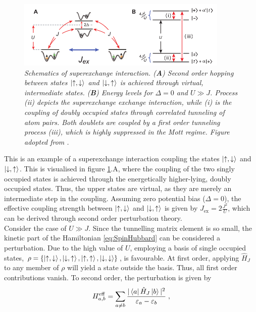 \begin{figure}[h]
	\centering
	\includegraphics[width=0.9\textwidth]{Figures/SXEschematic.pdf}
	\caption{\textit{Schematics of superexchange interaction. (\textbf{A}) Second order hopping between states $\ket{\uparrow,\downarrow}$ and $\ket{\downarrow,\uparrow}$ is achieved through virtual, intermediate states. (\textbf{B}) Energy levels for $\Delta = 0$ and $U \gg J$. Process (ii) depicts the superexchange exchange interaction, while (i) is the coupling of doubly occupied states through correlated tunneling of atom pairs. Both doublets are coupled by a first order tunneling process (iii), which is highly suppressed in the Mott regime. Figure adopted from \cite{Trotzky2008}.}}
	\label{fig:superexchange}
\end{figure}
This is an example of a superexchange interaction coupling the states $\ket{\uparrow,\downarrow}$ and $\ket{\downarrow,\uparrow}$. This is visualised in figure \ref{fig:superexchange}.A, where the coupling of the two singly occupied states is achieved through the energetically higher-lying, doubly occupied states. Thus, the upper states are virtual, as they are merely an intermediate step in the coupling.
Assuming zero potential bias ($\Delta = 0$), the effective coupling strength between $\ket{\uparrow,\downarrow}$ and $\ket{\downarrow,\uparrow}$ is given by $J_{\mathrm{ex}} = 2 \frac{J^2}{U}$, which can be derived through second order perturbation theory.\\
Consider the case of $U \gg J$. Since the tunnelling matrix element is so small, the kinetic part of the Hamiltonian \eqref{eq:SpinHubbard} can be considered a perturbation. Due to the high value of $U$, employing a basis of single occupied states, $\rho = \{ \ket{\uparrow , \downarrow} , \ket{ \downarrow, \uparrow} , \ket{\uparrow,\uparrow} , \ket{\downarrow,\downarrow} \}$, is favourable. At first order, applying $\hat{H}_J$ to any member of $\rho$ will yield a state outside the basis. Thus, all first order contributions vanish. To second order, the perturbation is given by
\begin{align}
	H_{a,b}^{\mathrm{eff}} = \sum_{a \neq b} \frac{ |\bra{a} \hat{H}_{J}\ket{b}|^2}{\varepsilon_a - \varepsilon_b} \; , \label{eq:2ndorderpertubation}
\end{align}
